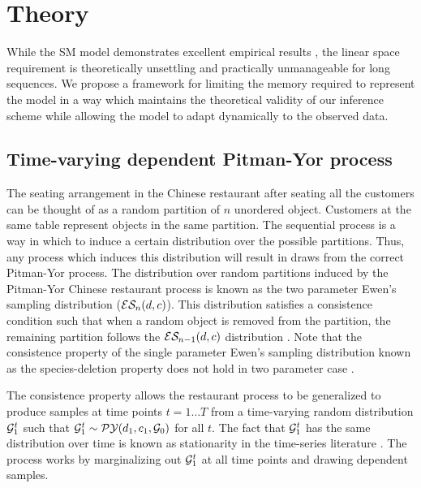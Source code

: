 \section{Theory}

While the SM model demonstrates excellent empirical results \cite{Gasthaus}, the linear space requirement is theoretically unsettling and practically unmanageable for long sequences.  We propose a framework for limiting the memory required to represent the model in a way which maintains the theoretical validity of our inference scheme while allowing the model to adapt dynamically to the observed data.

\subsection{Time-varying dependent Pitman-Yor process \cite{caron}} 

The seating arrangement in the Chinese restaurant after seating all the customers can be thought of as a random partition of $n$ unordered object.  Customers at the same table represent objects in the same partition.  The sequential process is a way in which to induce a certain distribution over the possible partitions.  Thus, any process which induces this distribution will result in draws from the correct Pitman-Yor process.  The distribution over random partitions induced by the Pitman-Yor Chinese restaurant process is known as the two parameter Ewen's sampling distribution ($\ES_n(d, c)$).  This distribution satisfies a consistence condition such that when a random object is removed from the partition, the remaining partition follows the $\ES_{n-1}(d,c)$ distribution \cite{pitman}.  Note that the consistence property of the single parameter Ewen's sampling distribution known as the species-deletion property \cite{kingman} does not hold in two parameter case \cite{pitman}.

The consistence property allows the restaurant process to be generalized to produce samples at time points $t = 1 \dots T$ from a time-varying random distribution $\G^t_1$ such that $\G^t_1 \sim \PY(d_1, c_1, \G_0)$ for all $t$.   The fact that $\G^t_1$ has the same distribution over time is known as stationarity in the time-series literature \cite{davis and brockwel?}.  The process works by marginalizing out $\G^t_1$ at all time points and drawing dependent samples.

